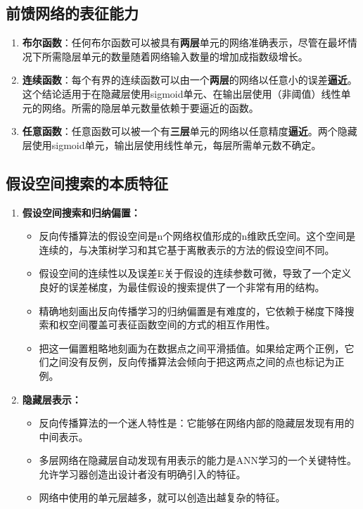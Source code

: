 \documentclass[../main.tex]{subfiles}
\begin{document}
\subsection{前馈网络的表征能力}\label{sec:ffn-capacity}
\begin{enumerate}
    \item \textbf{布尔函数}：任何布尔函数可以被具有\textbf{两层}单元的网络准确表示，尽管在最坏情况下所需隐层单元的数量随着网络输入数量的增加成指数级增长。
    \item \textbf{连续函数}：每个有界的连续函数可以由一个\textbf{两层}的网络以任意小的误差\textbf{逼近}。这个结论适用于在隐藏层使用sigmoid单元、在输出层使用（非阈值）线性单元的网络。所需的隐层单元数量依赖于要逼近的函数。
    \item \textbf{任意函数}：任意函数可以被一个有\textbf{三层}单元的网络以任意精度\textbf{逼近}。两个隐藏层使用sigmoid单元，输出层使用线性单元，每层所需单元数不确定。
\end{enumerate}

\subsection{假设空间搜索的本质特征}
\begin{enumerate}
    \item \textbf{假设空间搜索和归纳偏置：}
    {\small\kaishu
    \begin{itemize}
        \item 反向传播算法的假设空间是n个网络权值形成的n维欧氏空间。这个空间是连续的，与决策树学习和其它基于离散表示的方法的假设空间不同。
        \item 假设空间的连续性以及误差E关于假设的连续参数可微，导致了一个定义良好的误差梯度，为最佳假设的搜索提供了一个非常有用的结构。
        \item 精确地刻画出反向传播学习的归纳偏置是有难度的，它依赖于梯度下降搜索和权空间覆盖可表征函数空间的方式的相互作用性。
        \item 把这一偏置粗略地刻画为在数据点之间平滑插值。如果给定两个正例，它们之间没有反例，反向传播算法会倾向于把这两点之间的点也标记为正例。
    \end{itemize}
    }
    \item \textbf{隐藏层表示：}
    {\small\kaishu
    \begin{itemize}
        \item 反向传播算法的一个迷人特性是：它能够在网络内部的隐藏层发现有用的中间表示。
        \item 多层网络在隐藏层自动发现有用表示的能力是ANN学习的一个关键特性。允许学习器创造出设计者没有明确引入的特征。
        \item 网络中使用的单元层越多，就可以创造出越复杂的特征。
    \end{itemize}
    }
\end{enumerate}
\end{document}
